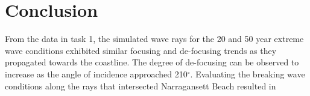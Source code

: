 \section{Conclusion}
From the data in task 1, the simulated wave rays for the 20 and 50 year extreme wave conditions exhibited similar focusing and de-focusing trends as they propagated towards the coastline. The degree of de-focusing can be observed to increase as the angle of incidence approached 210$^{\circ}$. Evaluating the breaking wave conditions along the rays that intersected Narragansett Beach resulted in 



